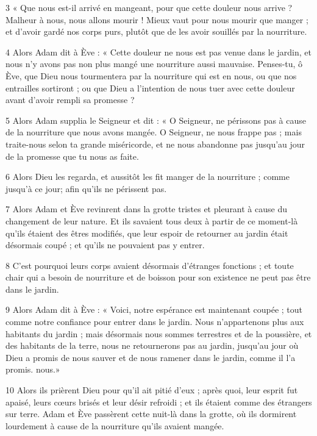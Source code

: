 \par 3 « Que nous est-il arrivé en mangeant, pour que cette douleur nous arrive ? Malheur à nous, nous allons mourir ! Mieux vaut pour nous mourir que manger ; et d'avoir gardé nos corps purs, plutôt que de les avoir souillés par la nourriture.

\par 4 Alors Adam dit à Ève : « Cette douleur ne nous est pas venue dans le jardin, et nous n'y avons pas non plus mangé une nourriture aussi mauvaise. Penses-tu, ô Ève, que Dieu nous tourmentera par la nourriture qui est en nous, ou que nos entrailles sortiront ; ou que Dieu a l’intention de nous tuer avec cette douleur avant d’avoir rempli sa promesse ?

\par 5 Alors Adam supplia le Seigneur et dit : « O Seigneur, ne périssons pas à cause de la nourriture que nous avons mangée. O Seigneur, ne nous frappe pas ; mais traite-nous selon ta grande miséricorde, et ne nous abandonne pas jusqu'au jour de la promesse que tu nous as faite.

\par 6 Alors Dieu les regarda, et aussitôt les fit manger de la nourriture ; comme jusqu'à ce jour; afin qu'ils ne périssent pas.

\par 7 Alors Adam et Ève revinrent dans la grotte tristes et pleurant à cause du changement de leur nature. Et ils savaient tous deux à partir de ce moment-là qu'ils étaient des êtres modifiés, que leur espoir de retourner au jardin était désormais coupé ; et qu'ils ne pouvaient pas y entrer.

\par 8 C'est pourquoi leurs corps avaient désormais d'étranges fonctions ; et toute chair qui a besoin de nourriture et de boisson pour son existence ne peut pas être dans le jardin.

\par 9 Alors Adam dit à Ève : « Voici, notre espérance est maintenant coupée ; tout comme notre confiance pour entrer dans le jardin. Nous n'appartenons plus aux habitants du jardin ; mais désormais nous sommes terrestres et de la poussière, et des habitants de la terre, nous ne retournerons pas au jardin, jusqu'au jour où Dieu a promis de nous sauver et de nous ramener dans le jardin, comme il l'a promis. nous.»

\par 10 Alors ils prièrent Dieu pour qu'il ait pitié d'eux ; après quoi, leur esprit fut apaisé, leurs cœurs brisés et leur désir refroidi ; et ils étaient comme des étrangers sur terre. Adam et Ève passèrent cette nuit-là dans la grotte, où ils dormirent lourdement à cause de la nourriture qu'ils avaient mangée.

